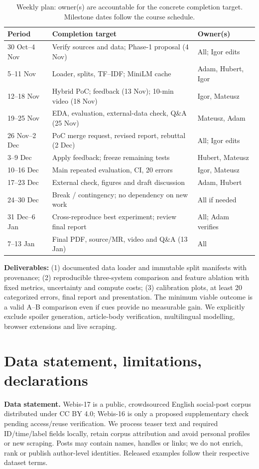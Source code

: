 \documentclass[11pt]{article}
\begin{document}
\begin{table}[]
\caption{Weekly plan: owner(s) are accountable for the concrete completion target. Milestone dates follow the course schedule.}
\label{tab:weekly}
\centering\scriptsize
\setlength{\tabcolsep}{3pt}
\begin{tabularx}{\columnwidth}{@{}p{1.55cm}X p{1.5cm}@{}}
\toprule
Period & Completion target & Owner(s)\\
\midrule
30 Oct--4 Nov & Verify sources and data; Phase-1 proposal (4 Nov) & All; Igor edits\\
5--11 Nov & Loader, splits, TF--IDF; MiniLM cache & Adam, Hubert, Igor\\
12--18 Nov & Hybrid PoC; feedback (13 Nov); 10-min video (18 Nov) & Igor, Mateusz\\
19--25 Nov & EDA, evaluation, external-data check, Q\&A (25 Nov) & Mateusz, Adam\\
26 Nov--2 Dec & PoC merge request, revised report, rebuttal (2 Dec) & All; Igor edits\\
3--9 Dec & Apply feedback; freeze remaining tests & Hubert, Mateusz\\
10--16 Dec & Main repeated evaluation, CI, 20 errors & Igor, Mateusz\\
17--23 Dec & External check, figures and draft discussion & Adam, Hubert\\
24--30 Dec & Break / contingency; no dependency on new work & All if needed\\
31 Dec--6 Jan & Cross-reproduce best experiment; review final report & All; Adam verifies\\
7--13 Jan & Final PDF, source/MR, video and Q\&A (13 Jan) & All\\
\bottomrule
\end{tabularx}
\end{table}

\textbf{Deliverables:} (1) documented data loader and immutable split manifests with provenance; (2) reproducible three-system comparison and feature ablation with fixed metrics, uncertainty and compute costs; (3) calibration plots, at least 20 categorized errors, final report and presentation. The minimum viable outcome is a valid A--B comparison even if cues provide no measurable gain. We explicitly exclude spoiler generation, article-body verification, multilingual modelling, browser extensions and live scraping.

\section{Data statement, limitations, declarations}
\textbf{Data statement.} Webis-17 is a public, crowdsourced English social-post corpus distributed under CC BY 4.0; Webis-16 is only a proposed supplementary check pending access/reuse verification. We process teaser text and required ID/time/label fields locally, retain corpus attribution and avoid personal profiles or new scraping. Posts may contain names, handles or links; we do not enrich, rank or publish author-level identities. Released examples follow their respective dataset terms.
\end{document}
